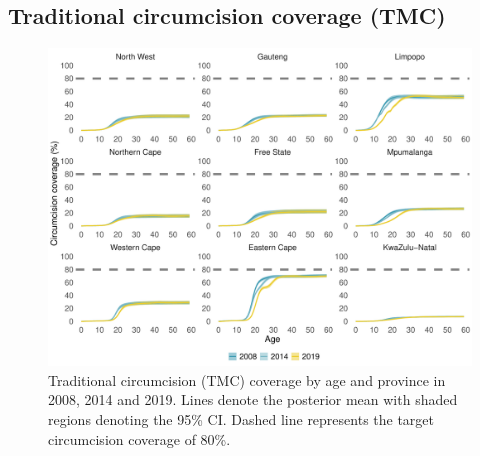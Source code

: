 \documentclass{article}
\begin{document}
\begin{appendix}

\subsection{Traditional circumcision coverage (TMC)}


\begin{figure}[H]
	\centering
	\includegraphics[width = \linewidth]{Figures/suppmat/Coverage/TMCcoverage_SingleAge_Province.pdf}
	\caption{Traditional circumcision (TMC) coverage by age and province in 2008, 2014 and 2019. Lines denote the posterior mean with shaded regions denoting the 95\% CI. Dashed line represents the target circumcision coverage of 80\%.}
\end{figure}	



\end{appendix}
\end{document}
